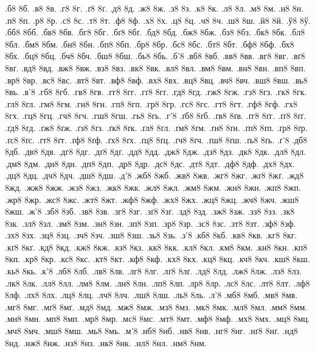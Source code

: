 {%
%
.б8
8б.
.в8
8в.
.г8
8г.
.ґ8
8ґ.
.д8
8д.
.ж8
8ж.
.з8
8з.
.к8
8к.
.л8
8л.
.м8
8м.
.н8
8н.
.п8
8п.
.р8
8р.
.с8
8с.
.т8
8т.
.ф8
8ф.
.х8
8х.
.ц8
8ц.
.ч8
8ч.
.ш8
8ш.
.й8
8й.
.ў8
8ў.
.бб8
8бб.
.бв8
8бв.
.бг8
8бг.
.бґ8
8бґ.
.бд8
8бд.
.бж8
8бж.
.бз8
8бз.
.бк8
8бк.
.бл8
8бл.
.бм8
8бм.
.бн8
8бн.
.бп8
8бп.
.бр8
8бр.
.бс8
8бс.
.бт8
8бт.
.бф8
8бф.
.бх8
8бх.
.бц8
8бц.
.бч8
8бч.
.бш8
8бш.
.бь8
8бь.
.б'8
.вб8
8вб.
.вв8
8вв.
.вг8
8вг.
.вґ8
8вґ.
.вд8
8вд.
.вж8
8вж.
.вз8
8вз.
.вк8
8вк.
.вл8
8вл.
.вм8
8вм.
.вн8
8вн.
.вп8
8вп.
.вр8
8вр.
.вс8
8вс.
.вт8
8вт.
.вф8
8вф.
.вх8
8вх.
.вц8
8вц.
.вч8
8вч.
.вш8
8вш.
.вь8
8вь.
.в'8
.гб8
8гб.
.гв8
8гв.
.гг8
8гг.
.гґ8
8гґ.
.гд8
8гд.
.гж8
8гж.
.гз8
8гз.
.гк8
8гк.
.гл8
8гл.
.гм8
8гм.
.гн8
8гн.
.гп8
8гп.
.гр8
8гр.
.гс8
8гс.
.гт8
8гт.
.гф8
8гф.
.гх8
8гх.
.гц8
8гц.
.гч8
8гч.
.гш8
8гш.
.гь8
8гь.
.г'8
.ґб8
8ґб.
.ґв8
8ґв.
.ґг8
8ґг.
.ґґ8
8ґґ.
.ґд8
8ґд.
.ґж8
8ґж.
.ґз8
8ґз.
.ґк8
8ґк.
.ґл8
8ґл.
.ґм8
8ґм.
.ґн8
8ґн.
.ґп8
8ґп.
.ґр8
8ґр.
.ґс8
8ґс.
.ґт8
8ґт.
.ґф8
8ґф.
.ґх8
8ґх.
.ґц8
8ґц.
.ґч8
8ґч.
.ґш8
8ґш.
.ґь8
8ґь.
.ґ'8
.дб8
8дб.
.дв8
8дв.
.дг8
8дг.
.дґ8
8дґ.
.дд8
8дд.
.дж8
8дж.
.дз8
8дз.
.дк8
8дк.
.дл8
8дл.
.дм8
8дм.
.дн8
8дн.
.дп8
8дп.
.др8
8др.
.дс8
8дс.
.дт8
8дт.
.дф8
8дф.
.дх8
8дх.
.дц8
8дц.
.дч8
8дч.
.дш8
8дш.
.д'8
.жб8
8жб.
.жв8
8жв.
.жг8
8жг.
.жґ8
8жґ.
.жд8
8жд.
.жж8
8жж.
.жз8
8жз.
.жк8
8жк.
.жл8
8жл.
.жм8
8жм.
.жн8
8жн.
.жп8
8жп.
.жр8
8жр.
.жс8
8жс.
.жт8
8жт.
.жф8
8жф.
.жх8
8жх.
.жц8
8жц.
.жч8
8жч.
.жш8
8жш.
.ж'8
.зб8
8зб.
.зв8
8зв.
.зг8
8зг.
.зґ8
8зґ.
.зд8
8зд.
.зж8
8зж.
.зз8
8зз.
.зк8
8зк.
.зл8
8зл.
.зм8
8зм.
.зн8
8зн.
.зп8
8зп.
.зр8
8зр.
.зс8
8зс.
.зт8
8зт.
.зф8
8зф.
.зх8
8зх.
.зц8
8зц.
.зч8
8зч.
.зш8
8зш.
.зь8
8зь.
.з'8
.кб8
8кб.
.кв8
8кв.
.кг8
8кг.
.кґ8
8кґ.
.кд8
8кд.
.кж8
8кж.
.кз8
8кз.
.кк8
8кк.
.кл8
8кл.
.км8
8км.
.кн8
8кн.
.кп8
8кп.
.кр8
8кр.
.кс8
8кс.
.кт8
8кт.
.кф8
8кф.
.кх8
8кх.
.кц8
8кц.
.кч8
8кч.
.кш8
8кш.
.кь8
8кь.
.к'8
.лб8
8лб.
.лв8
8лв.
.лг8
8лг.
.лґ8
8лґ.
.лд8
8лд.
.лж8
8лж.
.лз8
8лз.
.лк8
8лк.
.лл8
8лл.
.лм8
8лм.
.лн8
8лн.
.лп8
8лп.
.лр8
8лр.
.лс8
8лс.
.лт8
8лт.
.лф8
8лф.
.лх8
8лх.
.лц8
8лц.
.лч8
8лч.
.лш8
8лш.
.ль8
8ль.
.л'8
.мб8
8мб.
.мв8
8мв.
.мг8
8мг.
.мґ8
8мґ.
.мд8
8мд.
.мж8
8мж.
.мз8
8мз.
.мк8
8мк.
.мл8
8мл.
.мм8
8мм.
.мн8
8мн.
.мп8
8мп.
.мр8
8мр.
.мс8
8мс.
.мт8
8мт.
.мф8
8мф.
.мх8
8мх.
.мц8
8мц.
.мч8
8мч.
.мш8
8мш.
.мь8
8мь.
.м'8
.нб8
8нб.
.нв8
8нв.
.нг8
8нг.
.нґ8
8нґ.
.нд8
8нд.
.нж8
8нж.
.нз8
8нз.
.нк8
8нк.
.нл8
8нл.
.нм8
8нм.
}
